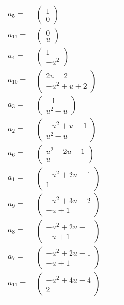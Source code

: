 \documentclass[1p]{elsarticle_modified}
\theoremstyle{definition}
\begin{document}
\begin{tabular}{m{7pt} m{180pt} m{7pt} m{180pt} }
\flushright $a_{5}=$&$\begin{pmatrix}1\\0\end{pmatrix}$ \\
\flushright $a_{12}=$&$\begin{pmatrix}0\\u\end{pmatrix}$ \\
\flushright $a_{4}=$&$\begin{pmatrix}1\\- u^2\end{pmatrix}$ \\
\flushright $a_{10}=$&$\begin{pmatrix}2 u-2\\- u^2+u+2\end{pmatrix}$ \\
\flushright $a_{3}=$&$\begin{pmatrix}-1\\u^2- u\end{pmatrix}$ \\
\flushright $a_{2}=$&$\begin{pmatrix}- u^2+u-1\\u^2- u\end{pmatrix}$ \\
\flushright $a_{6}=$&$\begin{pmatrix}u^2-2 u+1\\u\end{pmatrix}$ \\
\flushright $a_{1}=$&$\begin{pmatrix}- u^2+2 u-1\\1\end{pmatrix}$ \\
\flushright $a_{9}=$&$\begin{pmatrix}- u^2+3 u-2\\- u+1\end{pmatrix}$ \\
\flushright $a_{8}=$&$\begin{pmatrix}- u^2+2 u-1\\- u+1\end{pmatrix}$ \\
\flushright $a_{7}=$&$\begin{pmatrix}- u^2+2 u-1\\- u+1\end{pmatrix}$ \\
\flushright $a_{11}=$&$\begin{pmatrix}- u^2+4 u-4\\2\end{pmatrix}$\\&\end{tabular}
\end{document}
